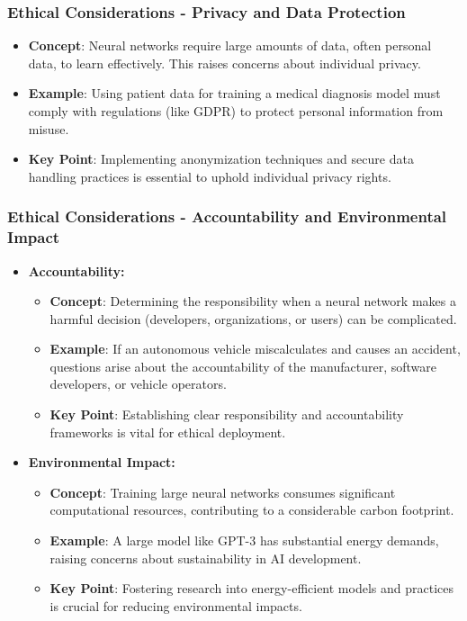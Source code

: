\documentclass[aspectratio=169]{beamer}
\begin{document}
\begin{frame}[fragile]
    \frametitle{Ethical Considerations - Privacy and Data Protection}
    \begin{itemize}
        \item \textbf{Concept}: Neural networks require large amounts of data, often personal data, to learn effectively. This raises concerns about individual privacy.
        \item \textbf{Example}: Using patient data for training a medical diagnosis model must comply with regulations (like GDPR) to protect personal information from misuse.
        \item \textbf{Key Point}: Implementing anonymization techniques and secure data handling practices is essential to uphold individual privacy rights.
    \end{itemize}
\end{frame}

\begin{frame}[fragile]
    \frametitle{Ethical Considerations - Accountability and Environmental Impact}
    \begin{itemize}
        \item \textbf{Accountability:}
            \begin{itemize}
                \item \textbf{Concept}: Determining the responsibility when a neural network makes a harmful decision (developers, organizations, or users) can be complicated.
                \item \textbf{Example}: If an autonomous vehicle miscalculates and causes an accident, questions arise about the accountability of the manufacturer, software developers, or vehicle operators.
                \item \textbf{Key Point}: Establishing clear responsibility and accountability frameworks is vital for ethical deployment.
            \end{itemize}
        \item \textbf{Environmental Impact:}
            \begin{itemize}
                \item \textbf{Concept}: Training large neural networks consumes significant computational resources, contributing to a considerable carbon footprint.
                \item \textbf{Example}: A large model like GPT-3 has substantial energy demands, raising concerns about sustainability in AI development.
                \item \textbf{Key Point}: Fostering research into energy-efficient models and practices is crucial for reducing environmental impacts.
            \end{itemize}
    \end{itemize}
\end{frame}
\end{document}
